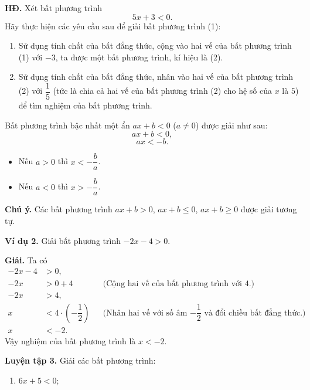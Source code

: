 \begin{lesson}
    \textbf{HĐ.} Xét bất phương trình
    \[
        5x+3<0. \tag{1}
    \]
    Hãy thực hiện các yêu cầu sau để giải bất phương trình (1):

    \begin{enumerate}[label=\alph*)]
        \item Sử dụng tính chất của bất đẳng thức, cộng vào hai vế của bất phương trình (1) với $-3$, ta được một bất phương trình, kí hiệu là (2).

        \answerline
        \item Sử dụng tính chất của bất đẳng thức, nhân vào hai vế của bất phương trình (2) với $\dfrac{1}{5}$ (tức là chia cả hai vế của bất phương trình (2) cho hệ số của $x$ là $5$) để tìm nghiệm của bất phương trình.

        \answerline
    \end{enumerate}

    \begin{keyconcept}
        Bất phương trình bậc nhất một ẩn $ax+b<0$ ($a\ne 0$) được giải như sau:
        \[
            ax+b<0,
        \]
        \[
            ax<-b.
        \]
        \begin{itemize}
            \item Nếu $a>0$ thì $x<-\dfrac{b}{a}$.
            \item Nếu $a<0$ thì $x>-\dfrac{b}{a}$.
        \end{itemize}
    \end{keyconcept}

    \textbf{Chú ý.} Các bất phương trình $ax+b>0$, $ax+b\leq 0$, $ax+b\geq 0$ được giải tương tự.

    \textbf{Ví dụ 2.} Giải bất phương trình $-2x-4>0$.

    \textbf{Giải.} Ta có
    \begin{align*}
        -2x-4 &> 0,\\
        -2x &> 0+4 && \text{(Cộng hai vế của bất phương trình với 4.)}\\
        -2x &> 4,\\
        x &< 4\cdot\left(-\dfrac{1}{2}\right) && \text{(Nhân hai vế với số âm $-\dfrac{1}{2}$ và đổi chiều bất đẳng thức.)}\\
        x &< -2.
    \end{align*}
    Vậy nghiệm của bất phương trình là $x<-2$.

    \textbf{Luyện tập 3.} Giải các bất phương trình:
    \begin{enumerate}[label=\alph*)]
        \item $6x+5<0$;


\end{enumerate}
\end{lesson}

